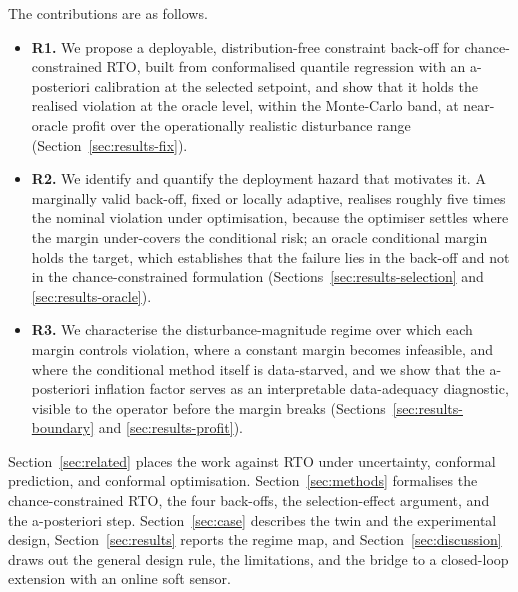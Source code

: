 The contributions are as follows.
\begin{itemize}
\item \textbf{R1.} We propose a deployable, distribution-free constraint back-off for
  chance-constrained RTO, built from conformalised quantile regression with an a-posteriori
  calibration at the selected setpoint, and show that it holds the realised violation at the
  oracle level, within the Monte-Carlo band, at near-oracle profit over the operationally
  realistic disturbance range (Section~\ref{sec:results-fix}).
\item \textbf{R2.} We identify and quantify the deployment hazard that motivates it. A
  marginally valid back-off, fixed or locally adaptive, realises roughly five times the
  nominal violation under optimisation, because the optimiser settles where the margin
  under-covers the conditional risk; an oracle conditional margin holds the target, which
  establishes that the failure lies in the back-off and not in the chance-constrained
  formulation (Sections~\ref{sec:results-selection} and \ref{sec:results-oracle}).
\item \textbf{R3.} We characterise the disturbance-magnitude regime over which each margin
  controls violation, where a constant margin becomes infeasible, and where the conditional
  method itself is data-starved, and we show that the a-posteriori inflation factor serves as
  an interpretable data-adequacy diagnostic, visible to the operator before the margin breaks
  (Sections~\ref{sec:results-boundary} and \ref{sec:results-profit}).
\end{itemize}

Section~\ref{sec:related} places the work against RTO under uncertainty, conformal
prediction, and conformal optimisation. Section~\ref{sec:methods} formalises the
chance-constrained RTO, the four back-offs, the selection-effect argument, and the
a-posteriori step. Section~\ref{sec:case} describes the twin and the experimental design,
Section~\ref{sec:results} reports the regime map, and Section~\ref{sec:discussion} draws out
the general design rule, the limitations, and the bridge to a closed-loop extension with an
online soft sensor.
